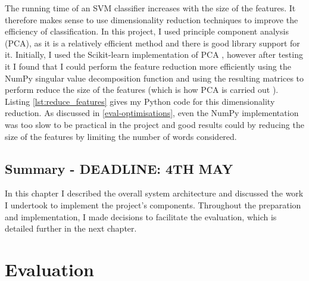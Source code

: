 \documentclass[12pt,a4paper,twoside,openright]{report}
\newcommand{\mylisting}[4]{}
\newcommand{\pylisting}[2]{\mylisting{Python}{py}{#1}{#2}}
\begin{document}
The running time of an SVM classifier increases with the size of the features. It therefore makes sense to use dimensionality reduction techniques to improve the efficiency of classification. In this project, I used principle component analysis (PCA), as it is a relatively efficient method and there is good library support for it. Initially, I used the Scikit-learn implementation of PCA \cite{sklearnpca}, however after testing it I found that I could perform the feature reduction more efficiently using the NumPy singular value decomposition function \cite{numpysvd} and using the resulting matrices to perform reduce the size of the features (which is how PCA is carried out \cite{svd}). Listing \ref{lst:reduce_features} gives my Python code for this dimensionality reduction. As discussed in \ref{eval-optimisations}, even the NumPy implementation was too slow to be practical in the project and good results could by reducing the size of the features by limiting the number of words considered.

\pylisting{A function using NumPy array operations to perform singular value decomposition on two sets of given features}{reduce_features}

\section{Summary - DEADLINE: 4TH MAY}

In this chapter I described the overall system architecture and discussed the work I undertook to implement the project's components. Throughout the preparation and implementation, I made decisions to facilitate the evaluation, which is detailed further in the next chapter.

\chapter{Evaluation} \label{eval}

\end{document}
